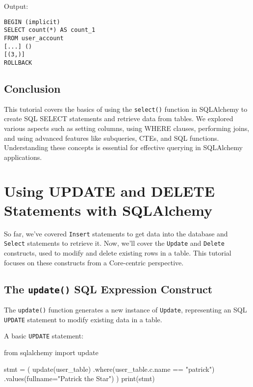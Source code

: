 \documentclass[
  letterpaper,
  DIV=11,
  numbers=noendperiod]{scrreprt}
\newenvironment{Shaded}{\begin{snugshade}}{\end{snugshade}}
\newcommand{\BuiltInTok}[1]{\textcolor[rgb]{0.00,0.23,0.31}{#1}}
\newcommand{\ImportTok}[1]{\textcolor[rgb]{0.00,0.46,0.62}{#1}}
\newcommand{\NormalTok}[1]{\textcolor[rgb]{0.00,0.23,0.31}{#1}}
\newcommand{\OperatorTok}[1]{\textcolor[rgb]{0.37,0.37,0.37}{#1}}
\newcommand{\StringTok}[1]{\textcolor[rgb]{0.13,0.47,0.30}{#1}}
\begin{document}
Output:

\begin{verbatim}
BEGIN (implicit)
SELECT count(*) AS count_1
FROM user_account
[...] ()
[(3,)]
ROLLBACK
\end{verbatim}

\subsection{Conclusion}\label{conclusion-21}

This tutorial covers the basics of using the \texttt{select()} function
in SQLAlchemy to create SQL SELECT statements and retrieve data from
tables. We explored various aspects such as setting columns, using WHERE
clauses, performing joins, and using advanced features like subqueries,
CTEs, and SQL functions. Understanding these concepts is essential for
effective querying in SQLAlchemy applications.

\section{Using UPDATE and DELETE Statements with
SQLAlchemy}\label{using-update-and-delete-statements-with-sqlalchemy}

So far, we've covered \texttt{Insert} statements to get data into the
database and \texttt{Select} statements to retrieve it. Now, we'll cover
the \texttt{Update} and \texttt{Delete} constructs, used to modify and
delete existing rows in a table. This tutorial focuses on these
constructs from a Core-centric perspective.

\subsection{\texorpdfstring{The \texttt{update()} SQL Expression
Construct}{The update() SQL Expression Construct}}\label{the-update-sql-expression-construct}

The \texttt{update()} function generates a new instance of
\texttt{Update}, representing an SQL \texttt{UPDATE} statement to modify
existing data in a table.

A basic \texttt{UPDATE} statement:

\begin{Shaded}
\begin{Highlighting}[]
\ImportTok{from}\NormalTok{ sqlalchemy }\ImportTok{import}\NormalTok{ update}

\NormalTok{stmt }\OperatorTok{=}\NormalTok{ (}
\NormalTok{    update(user\_table)}
\NormalTok{    .where(user\_table.c.name }\OperatorTok{==} \StringTok{"patrick"}\NormalTok{)}
\NormalTok{    .values(fullname}\OperatorTok{=}\StringTok{"Patrick the Star"}\NormalTok{)}
\NormalTok{)}
\BuiltInTok{print}\NormalTok{(stmt)}
\end{Highlighting}
\end{Shaded}
\end{document}
